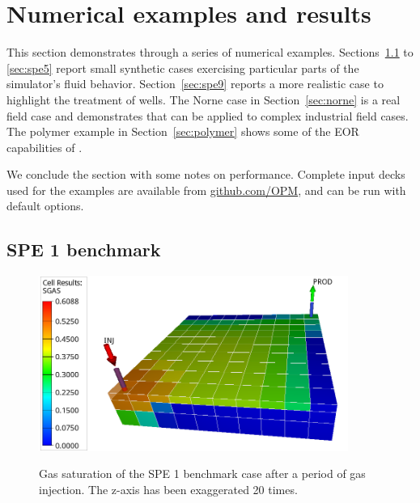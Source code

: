 \section{Numerical examples and results}\label{sec:numericalresults}

This section demonstrates \opmflow through a series of numerical examples.
Sections~\ref{sec:spe1} to \ref{sec:spe5} report small synthetic cases exercising
particular parts of the simulator's fluid behavior. Section~\ref{sec:spe9} reports a more
realistic case to highlight the treatment of wells. The Norne case in
Section~\ref{sec:norne} is a real field case and demonstrates that \opmflow can be applied
to complex industrial field cases. The polymer example in Section~\ref{sec:polymer} shows
some of the EOR capabilities of \opmflow.

We conclude the section with some notes on performance. Complete input decks used for the
examples are available from \href{http://github.com/OPM}{github.com/OPM}, and can be run
with default options.

\subsection{SPE 1 benchmark}
\label{sec:spe1}

\begin{figure}
\centering
{\includegraphics[width=0.9\textwidth]{figures/spe1/spe1_sgas}}
\caption{Gas saturation of the SPE 1 benchmark case after a period of gas injection. The z-axis
  has been exaggerated 20 times.}
\label{fig:spe1_sgas}
\end{figure}

